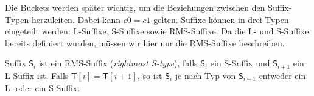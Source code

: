Die Buckets werden später wichtig, um die Beziehungen zwischen den Suffix-Typen herzuleiten. Dabei kann $c0=c1$ gelten. 
\fi
Suffixe können in drei Typen eingeteilt werden: L-Suffixe, S-Suffixe sowie RMS-Suffixe. Da die L- und S-Suffixe bereits definiert wurden, müssen wir hier nur die RMS-Suffixe beschreiben.
\iffalse
\begin{definition}
	Suffix $\mathsf{S}_i$ ist ein
	\begin{itemize}
		\item L-Suffix, falls $\mathsf{T}[i] > \mathsf{T}[i+1]$ oder $i=n-1$.
		\item S-Suffix, falls $\mathsf{T}[i] < \mathsf{T}[i+1]$.
		\item RMS-Suffix, falls $\mathsf{S}_i$ ein S-Suffix und $\mathsf{S}_{i+1}$ ein L-Suffix ist.
	\end{itemize}
	Falls $\mathsf{T}[i] = \mathsf{T}[i+1]$, so ist $\mathsf{S}_i$ je nach Typ von $\mathsf{S}_{i+1}$ entweder ein L- oder ein S-Suffix.
\end{definition}
\fi
\begin{definition}
	Suffix $\mathsf{S}_i$ ist ein RMS-Suffix (\textit{rightmost S-type}), falls $\mathsf{S}_i$ ein S-Suffix und $\mathsf{S}_{i+1}$ ein L-Suffix ist.
	Falls $\mathsf{T}[i] = \mathsf{T}[i+1]$, so ist $\mathsf{S}_i$ je nach Typ von $\mathsf{S}_{i+1}$ entweder ein L- oder ein S-Suffix.
\end{definition}

